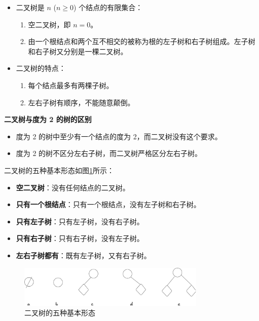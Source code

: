 \documentclass[lang=cn,newtx,10pt,scheme=chinese]{../elegantbook}
\begin{document}
\begin{itemize}
  \item 二叉树是 $n$ ($n \geq 0$) 个结点的有限集合：
  \begin{enumerate}
    \item 空二叉树，即 $n = 0$。
    \item 由一个根结点和两个互不相交的被称为根的左子树和右子树组成。左子树和右子树又分别是一棵二叉树。
  \end{enumerate}
  \item 二叉树的特点：
  \begin{enumerate}
    \item 每个结点最多有两棵子树。
    \item 左右子树有顺序，不能随意颠倒。
  \end{enumerate}
\end{itemize}

\textbf{二叉树与度为 2 的树的区别}

\begin{itemize}
  \item 度为 2 的树中至少有一个结点的度为 2，而二叉树没有这个要求。
  \item 度为 2 的树不区分左右子树，而二叉树严格区分左右子树。
\end{itemize}


二叉树的五种基本形态如图\ref{fig:binary_tree}所示：

\begin{itemize}
  \item \textbf{空二叉树}：没有任何结点的二叉树。
  \item \textbf{只有一个根结点}：只有一个根结点，没有左子树和右子树。
  \item \textbf{只有左子树}：只有左子树，没有右子树。
  \item \textbf{只有右子树}：只有右子树，没有左子树。
  \item \textbf{左右子树都有}：既有左子树，又有右子树。
\end{itemize}



\begin{figure}[h]
  \centering
  \includegraphics[width=0.8\textwidth]{./figure/pdf/cropped/fiveBTree.pdf}
  \caption{二叉树的五种基本形态}
  \label{fig:binary_tree}
\end{figure}
\end{document}
